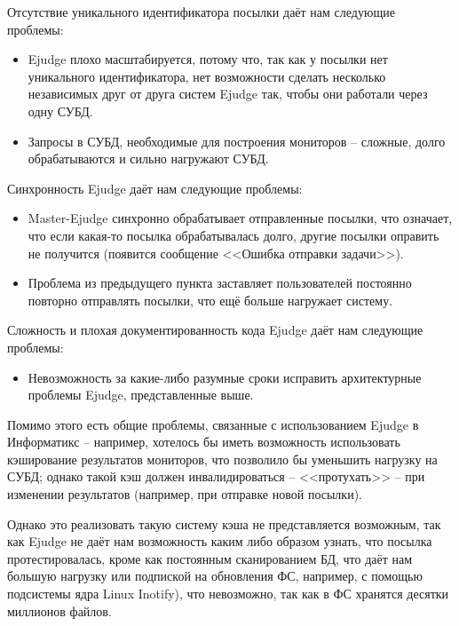 Отсутствие уникального идентификатора посылки даёт нам следующие проблемы:

\begin{itemize}
    \item Ejudge плохо масштабируется, потому что, так как у посылки нет уникального идентификатора, 
нет возможности сделать несколько независимых друг от друга систем Ejudge так, чтобы они работали через одну СУБД.
    \item Запросы в СУБД, необходимые для построения мониторов -- сложные, долго обрабатываются и сильно нагружают СУБД.
\end{itemize}

Синхронность Ejudge даёт нам следующие проблемы:

\begin{itemize}
    \item Master-Ejudge синхронно обрабатывает отправленные посылки, что означает, что 
если какая-то посылка обрабатывалась долго, другие посылки оправить не получится
(появится сообщение <<Ошибка отправки задачи>>).
    \item Проблема из предыдущего пункта заставляет пользователей постоянно повторно отправлять посылки, что ещё больше нагружает систему.
\end{itemize}

Сложность и плохая документированность кода Ejudge даёт нам следующие проблемы:
\begin{itemize}
    \item Невозможность за какие-либо разумные сроки исправить архитектурные проблемы Ejudge, представленные выше.
\end{itemize}

Помимо этого есть общие проблемы, связанные с использованием Ejudge в Информатикс -- например, 
хотелось бы иметь возможность использовать кэширование результатов мониторов, что позволило бы уменьшить нагрузку на СУБД;
однако такой кэш должен инвалидироваться -- <<протухать>> -- при изменении результатов (например, при отправке новой посылки).

Однако это реализовать такую систему кэша не представляется возможным, 
так как Ejudge не даёт нам возможность каким либо образом узнать, что посылка протестировалась, 
кроме как постоянным сканированием БД, что даёт нам большую нагрузку
или подпиской на обновления ФС, например, с помощью подсистемы ядра Linux Inotify), \label{chap:inotify}
что невозможно, так как в ФС хранятся десятки миллионов файлов\cite{many_files}.

